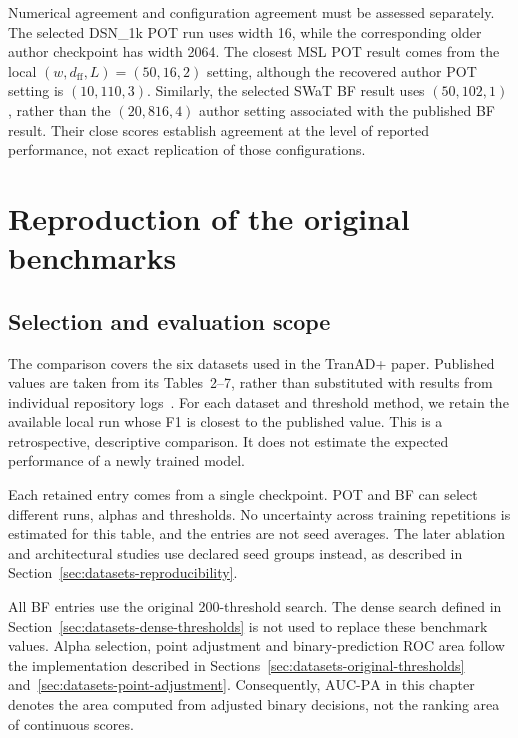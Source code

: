 
Numerical agreement and configuration agreement must be assessed
separately. The selected DSN\_1k \ac{POT} run uses width \num{16}, while
the corresponding older author checkpoint has width \num{2064}.
The closest \ac{MSL} \ac{POT} result comes from the local
\((w,d_{\mathrm{ff}},L)=(\num{50},\num{16},\num{2})\) setting,
although the recovered author \ac{POT} setting is
\((\num{10},\num{110},\num{3})\). Similarly, the selected SWaT BF
result uses \((\num{50},\num{102},\num{1})\), rather than the
\((\num{20},\num{816},\num{4})\) author setting associated with the
published BF result. Their close scores establish agreement at the level
of reported performance, not exact replication of those configurations.

\section{Reproduction of the original benchmarks}
\label{sec:replication-benchmarks}
\subsection{Selection and evaluation scope}
The comparison covers the six datasets used in the TranAD+ paper.
Published values are taken from its Tables~\num{2}--\num{7}, rather than
substituted with results from individual repository logs~\cite{Yermakov2025TranADPlus}.
For each dataset and threshold method, we retain the available local
run whose F1 is closest to the published value. This is a retrospective,
descriptive comparison. It does not estimate the expected performance
of a newly trained model.

Each retained entry comes from a single checkpoint. \ac{POT} and BF can
select different runs, alphas and thresholds. No uncertainty across
training repetitions is estimated for this table, and the entries are
not seed averages. The later ablation and architectural studies use
declared seed groups instead, as described in
Section~\ref{sec:datasets-reproducibility}.

All BF entries use the original \num{200}-threshold search. The dense
search defined in Section~\ref{sec:datasets-dense-thresholds} is not used
to replace these benchmark values. Alpha selection, point adjustment and
binary-prediction \ac{ROC} area follow the implementation described in
Sections~\ref{sec:datasets-original-thresholds}
and~\ref{sec:datasets-point-adjustment}. Consequently, \(\mathrm{AUC\mbox{-}PA}\)
in this chapter denotes the area computed from adjusted binary decisions,
not the ranking area of continuous scores.

